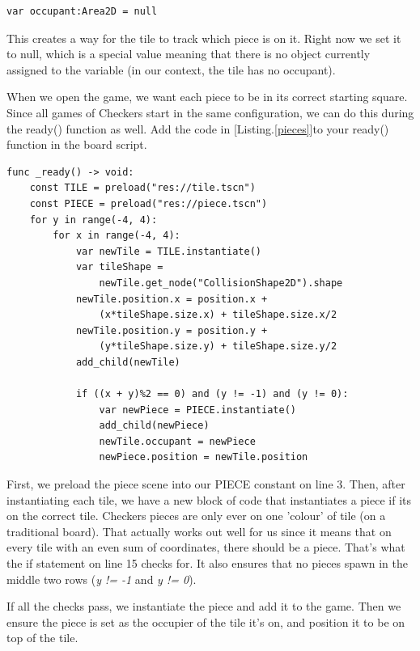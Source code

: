 \documentclass[14pt]{extarticle}
\newcommand{\prettyref}[2]{[{#1}.\ref{#2}]}
\begin{document}
\begin{lstlisting}[language=gdscript, label={Area}, caption=Making a variable]
var occupant:Area2D = null
\end{lstlisting}

This creates a way for the tile to track which piece is on it. Right now we set it to null, which is a special value meaning that there is no object currently assigned to the variable (in our context, the tile has no occupant).

When we open the game, we want each piece to be in its correct starting square. Since all games of Checkers start in the same configuration, we can do this during the ready() function as well. Add the code in \prettyref{Listing}{pieces}to your ready() function in the board script.

\begin{lstlisting}[language=gdscript, label={pieces}, caption=Adding pieces to the board]
func _ready() -> void:
	const TILE = preload("res://tile.tscn")
	const PIECE = preload("res://piece.tscn")
	for y in range(-4, 4):
		for x in range(-4, 4):
			var newTile = TILE.instantiate()
			var tileShape =
                newTile.get_node("CollisionShape2D").shape
			newTile.position.x = position.x +
                (x*tileShape.size.x) + tileShape.size.x/2
			newTile.position.y = position.y +
                (y*tileShape.size.y) + tileShape.size.y/2
			add_child(newTile)
			
			if ((x + y)%2 == 0) and (y != -1) and (y != 0):
				var newPiece = PIECE.instantiate()
				add_child(newPiece)
				newTile.occupant = newPiece
				newPiece.position = newTile.position
\end{lstlisting}

First, we preload the piece scene into our PIECE constant on line 3. Then, after instantiating each tile, we have a new block of code that instantiates a piece if its on the correct tile. Checkers pieces are only ever on one 'colour' of tile (on a traditional board). That actually works out well for us since it means that on every tile with an even sum of coordinates, there should be a piece. That's what the if statement on line 15 checks for. It also ensures that no pieces spawn in the middle two rows (\textit{y != -1} and \textit{y != 0}).

If all the checks pass, we instantiate the piece and add it to the game. Then we ensure the piece is set as the occupier of the tile it's on, and position it to be on top of the tile.
\end{document}
